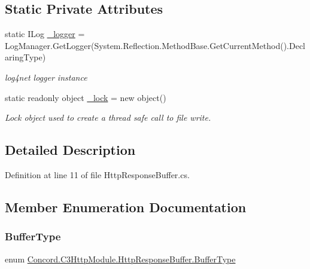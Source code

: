 \subsection*{Static Private Attributes}
\begin{DoxyCompactItemize}
\item 
static I\+Log \mbox{\hyperlink{class_concord_1_1_c3_http_module_1_1_http_response_buffer_a6e29f78b66c34071da9a96d6be4e59cb}{\+\_\+logger}} = Log\+Manager.\+Get\+Logger(System.\+Reflection.\+Method\+Base.\+Get\+Current\+Method().Declaring\+Type)
\begin{DoxyCompactList}\small\item\em log4net logger instance \end{DoxyCompactList}\item 
static readonly object \mbox{\hyperlink{class_concord_1_1_c3_http_module_1_1_http_response_buffer_a6846fa3b517f31f92ed4a2a15cb1767b}{\+\_\+lock}} = new object()
\begin{DoxyCompactList}\small\item\em Lock object used to create a thread safe call to file write. \end{DoxyCompactList}\end{DoxyCompactItemize}


\subsection{Detailed Description}


Definition at line 11 of file Http\+Response\+Buffer.\+cs.



\subsection{Member Enumeration Documentation}
\mbox{\label{class_concord_1_1_c3_http_module_1_1_http_response_buffer_a34a310395d4f4472b24cf6da3fc3ab82}} 
\subsubsection{\texorpdfstring{BufferType}{BufferType}}
{\footnotesize\ttfamily enum \mbox{\hyperlink{class_concord_1_1_c3_http_module_1_1_http_response_buffer_a34a310395d4f4472b24cf6da3fc3ab82}{Concord.\+C3\+Http\+Module.\+Http\+Response\+Buffer.\+Buffer\+Type}}\hspace{0.3cm}{\ttfamily [strong]}}



